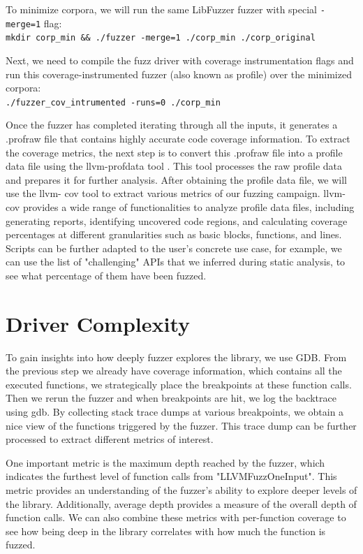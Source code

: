 \documentclass[a4paper,11pt,oneside]{report}
\begin{document}
To minimize corpora, we will run the same LibFuzzer fuzzer with special \lstinline{-merge=1} 
flag: \\
\lstinline{mkdir corp_min && ./fuzzer -merge=1 ./corp_min ./corp_original}

Next, we need to compile the fuzz driver with coverage instrumentation flags 
and run this coverage-instrumented fuzzer (also known as profile) over the minimized corpora: \\
\lstinline{./fuzzer_cov_intrumented -runs=0 ./corp_min}

Once the fuzzer has completed iterating through all the inputs, it 
generates a .profraw file that contains highly accurate code coverage 
information. To extract the coverage metrics, the next step is to convert 
this .profraw file into a profile data file using the llvm-profdata tool \cite{profdata}. 
This tool processes the raw profile data and prepares it for further 
analysis. After obtaining the profile data file, we will use the llvm-
cov tool to extract various metrics of our fuzzing campaign. 
llvm-cov \cite{cov} provides a wide range of functionalities to analyze profile data 
files, including generating reports, identifying uncovered code regions, 
and calculating coverage percentages at different granularities such as 
basic blocks, functions, and lines. Scripts can be further adapted to
the user's concrete use case, for example, we can use the list of 
"challenging" APIs that we inferred during static analysis, to see
what percentage of them have been fuzzed.

\section{Driver Complexity}
To gain insights into how deeply fuzzer explores the library, we use GDB. 
From the previous step we already have coverage information, which
contains all the executed functions, we strategically place the breakpoints
at these function calls. Then we rerun the fuzzer and when breakpoints are hit,
we log the backtrace using gdb. By collecting stack trace dumps at various 
breakpoints, we obtain a nice view of the functions triggered by the fuzzer. 
This trace dump can be further processed to extract different metrics of
interest.

One important metric is the maximum depth reached by the fuzzer,
which indicates the furthest level of function calls from "LLVMFuzzOneInput".
This metric provides an understanding of the fuzzer's ability to explore
deeper levels of the library. Additionally, average depth provides
a measure of the overall depth of function calls. We can also combine
these metrics with per-function coverage to see how being deep in
the library correlates with how much the function is fuzzed.
\end{document}
